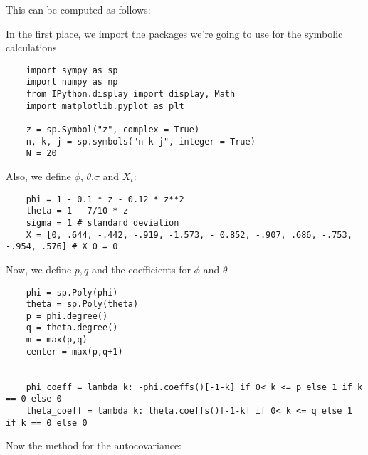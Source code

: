 This can be computed as follows:

In the first place, we import the packages we're going to use for the symbolic calculations

\begin{verbatim}
    import sympy as sp
    import numpy as np
    from IPython.display import display, Math
    import matplotlib.pyplot as plt

    z = sp.Symbol("z", complex = True)
    n, k, j = sp.symbols("n k j", integer = True)
    N = 20
\end{verbatim}

Also, we define $\phi$, $\theta$,$\sigma$ and $X_t$:

\begin{verbatim}
    phi = 1 - 0.1 * z - 0.12 * z**2
    theta = 1 - 7/10 * z
    sigma = 1 # standard deviation
    X = [0, .644, -.442, -.919, -1.573, - 0.852, -.907, .686, -.753, -.954, .576] # X_0 = 0
\end{verbatim}

Now, we define $p,q$ and the coefficients for $\phi$ and $\theta$

\begin{verbatim}
    phi = sp.Poly(phi)
    theta = sp.Poly(theta)
    p = phi.degree()
    q = theta.degree()
    m = max(p,q)
    center = max(p,q+1)


    phi_coeff = lambda k: -phi.coeffs()[-1-k] if 0< k <= p else 1 if k == 0 else 0
    theta_coeff = lambda k: theta.coeffs()[-1-k] if 0< k <= q else 1 if k == 0 else 0
\end{verbatim}

Now the method for the autocovariance: 

